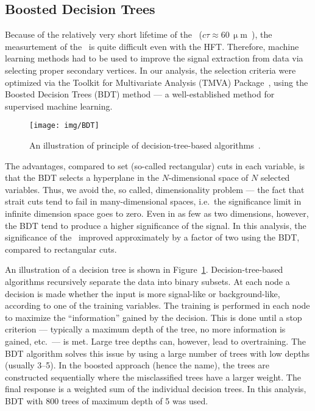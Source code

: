 \subsection{Boosted Decision Trees}

Because of the relatively very short lifetime of the \Lambdac\ ($c\tau \approx 60\,\upmu$m~\cite{PDG}), the measurtement of the \Lambdac\ is quite difficult even with the HFT\@. Therefore, machine learning methods had to be used to improve the signal extraction from data via selecting proper secondary vertices.
In our analysis, the selection criteria were optimized via the Toolkit for Multivariate Analysis (TMVA) Package~\cite{TMVA}, using the Boosted Decision Trees (BDT) method --- a well-established method for supervised machine learning.


\begin{figure}[!htb]
\centering
\texttt{[image: img/BDT]}
\caption{\label{BDT}An illustration of principle of decision-tree-based algorithms~\cite{TMVA}\@.}
\end{figure}

The advantages, compared to set (so-called rectangular) cuts in each variable, is that the BDT selects a hyperplane in the $N$-dimensional space of $N$ selected variables. Thus, we avoid the, so called, dimensionality problem --- the fact that strait cuts tend to fail in many-dimensional spaces, i.e.\ the significance limit in infinite dimension space goes to zero. Even in as few as two dimensions, however, the BDT tend to produce a higher significance of the signal. In this analysis, the significance of the \Lambdac\ improved approximately by a factor of two using the BDT, compared to rectangular cuts.


An illustration of a decision tree is shown in Figure~\ref{BDT}\@. Decision-tree-based algorithms recursively separate the data into binary subsets. At each node a decision is made whether the input is more signal-like or background-like, according to one of the training variables. The training is performed in each node to maximize the ``information'' gained by the decision. This is done until a stop criterion --- typically a maximum depth of the tree, no more information is gained, etc.\ --- is met. Large tree depths can, however, lead to overtraining. The BDT algorithm solves this issue by using a large number of trees with low depths (usually 3--5)\@. In the boosted approach (hence the name), the trees are constructed sequentially where the misclassified trees have a larger weight. The final response is a weighted sum of the individual decision trees. In this analysis, BDT with 800 trees of maximum depth of 5 was used.


